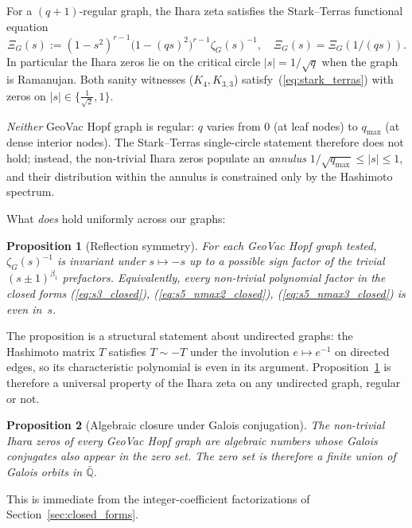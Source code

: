 \documentclass[11pt]{article}
\newtheorem{proposition}{Proposition}
\begin{document}
For a $(q{+}1)$-regular graph, the Ihara zeta satisfies the
Stark--Terras functional equation~\cite{stark1996,terras2010}
\begin{equation}
\Xi_G(s) := (1 - s^2)^{r-1}\bigl(1 - (qs)^2\bigr)^{r-1}\zeta_G(s)^{-1},
\quad \Xi_G(s) = \Xi_G(1/(qs)).
\label{eq:stark_terras}
\end{equation}
In particular the Ihara zeros lie on the critical circle $|s|=1/\sqrt{q}$
when the graph is Ramanujan.  Both sanity witnesses ($K_4, K_{3,3}$)
satisfy~(\ref{eq:stark_terras}) with zeros on $|s|\in\{\tfrac{1}{\sqrt{2}},
1\}$.

\emph{Neither} GeoVac Hopf graph is regular: $q$ varies from 0 (at
leaf nodes) to $q_{\max}$ (at dense interior nodes).  The Stark--Terras
single-circle statement therefore does not hold; instead, the
non-trivial Ihara zeros populate an \emph{annulus}
$1/\sqrt{q_{\max}}\le|s|\le 1$, and their distribution within the
annulus is constrained only by the Hashimoto spectrum.

What \emph{does} hold uniformly across our graphs:

\begin{proposition}[Reflection symmetry]
\label{prop:reflection}
For each GeoVac Hopf graph tested, $\zeta_G(s)^{-1}$ is invariant
under $s\mapsto -s$ up to a possible sign factor of the trivial
$(s\pm 1)^{\beta_1}$ prefactors.  Equivalently, every non-trivial
polynomial factor in the closed forms
(\ref{eq:s3_closed}), (\ref{eq:s5_nmax2_closed}),
(\ref{eq:s5_nmax3_closed}) is even in~$s$.
\end{proposition}

The proposition is a structural statement about undirected graphs:
the Hashimoto matrix $T$ satisfies $T\sim -T$ under the involution
$e\mapsto e^{-1}$ on directed edges, so its characteristic polynomial
is even in its argument.  Proposition~\ref{prop:reflection} is
therefore a universal property of the Ihara zeta on any undirected
graph, regular or not.

\begin{proposition}[Algebraic closure under Galois conjugation]
\label{prop:galois}
The non-trivial Ihara zeros of every GeoVac Hopf graph are algebraic
numbers whose Galois conjugates also appear in the zero set.  The
zero set is therefore a finite union of Galois orbits in
$\bar{\mathbb{Q}}$.
\end{proposition}

This is immediate from the integer-coefficient factorizations of
Section~\ref{sec:closed_forms}.
\end{document}
